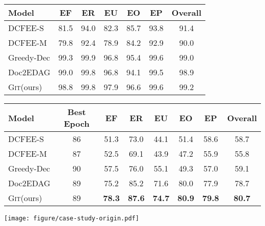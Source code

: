 \documentclass[11pt,a4paper]{article}
\newcommand{\modelname}{\textsc{Git}\xspace}
\begin{document}
\begin{table*}[htbp]
\centering
\begin{tabular}{lcccccc}
\hline
\bf Model & \bf EF & \bf ER & \bf EU & \bf EO & \bf EP & \bf Overall \\
\hline
DCFEE-S  & 81.5 & 94.0 & 82.3 & 85.7 & 93.8 & 91.4 \\
DCFEE-M  & 79.8 & 92.4 & 78.9 & 84.2 & 92.9 & 90.0 \\
Greedy-Dec  & 99.3 & 99.9 & 96.8 & 95.4 & 99.6 & 99.0 \\
Doc2EDAG  & 99.0 & 99.8 & 96.8 & 94.1 & 99.5 & 98.9 \\
\hline
\modelname (ours) & 98.8 & 99.8 & 97.9 & 96.6 & 99.6 & 99.2 \\
\hline
\end{tabular}
\caption{F1 scores results of \textbf{event types detection} sub-task on the test set. All the models obtains more than 90.0 micro F1 score. \modelname slightly outperform Doc2EDAG.
}
\label{table:triggering}
\end{table*}


\begin{table*}[htbp]
\centering
\begin{tabular}{lccccccc}
\hline
\bf Model & \bf Best Epoch & \bf EF & \bf ER & \bf EU & \bf EO & \bf EP & \bf Overall \\
\hline
DCFEE-S  & 86 & 51.3 & 73.0 & 44.1 & 51.4 & 58.6 & 58.7 \\
DCFEE-M  & 87 & 52.5 & 69.1 & 43.9 & 47.2 & 55.9 & 55.8 \\
Greedy-Dec  & 90 & 57.5 & 76.0 & 55.1 & 49.3 & 57.0 & 59.1 \\
Doc2EDAG  & 89 & 75.2 & 85.2 & 71.6 & 80.0 & 77.9 & 78.7 \\
\hline
\modelname (ours) & 89 & \bf 78.3 & \bf 87.6 & \bf 74.7 & \bf 80.9 & \bf 79.8 & \bf 80.7 \\
\hline
\end{tabular}
\caption{The best epoch in which the models achieve the highest \textbf{micro F1 score on the dev set} and the corresponding performance.
}
\label{table:dev}
\end{table*}

\begin{figure*}[h]
    \centering
    \texttt{[image: figure/case-study-origin.pdf]}
    \caption{The original complete document corresponding to the case study in Figure~\ref{fig:case-study}. Sentences in red color are presented in Figure~\ref{fig:case-study}.}
    \label{fig:case-study-origin}
\end{figure*}
\end{document}
